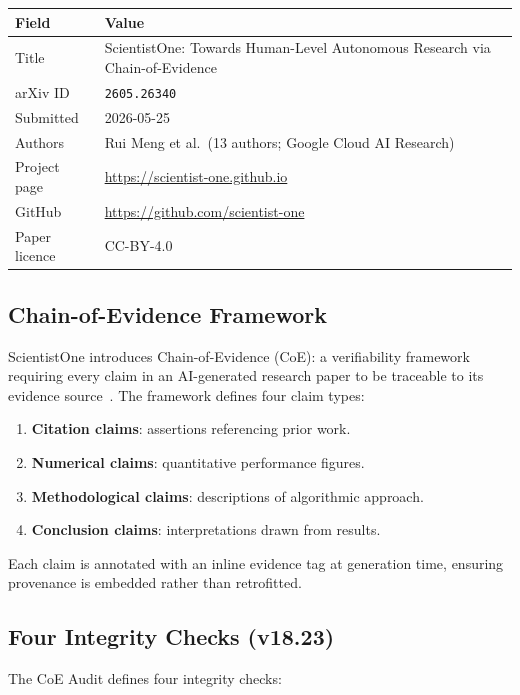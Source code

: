 \begin{center}
\begin{tabular}{ll}
\textbf{Field} & \textbf{Value} \\
\hline
Title & ScientistOne: Towards Human-Level Autonomous Research via Chain-of-Evidence \\
arXiv ID & \texttt{2605.26340} \\
Submitted & 2026-05-25 \\
Authors & Rui Meng et al.\ (13 authors; Google Cloud AI Research) \\
Project page & \url{https://scientist-one.github.io} \\
GitHub & \url{https://github.com/scientist-one} \\
Paper licence & CC-BY-4.0 \\
\end{tabular}
\end{center}

\subsection{Chain-of-Evidence Framework}
\label{ssec:coe-framework}

ScientistOne introduces Chain-of-Evidence (CoE): a verifiability framework
requiring every claim in an AI-generated research paper to be traceable to
its evidence source~\cite{scientistone_deep}.  The framework defines four
claim types:

\begin{enumerate}
  \item \textbf{Citation claims}: assertions referencing prior work.
  \item \textbf{Numerical claims}: quantitative performance figures.
  \item \textbf{Methodological claims}: descriptions of algorithmic approach.
  \item \textbf{Conclusion claims}: interpretations drawn from results.
\end{enumerate}

Each claim is annotated with an inline evidence tag at generation time,
ensuring provenance is embedded rather than retrofitted.

\subsection{Four Integrity Checks (v18.23)}
\label{ssec:coe-checks}

The CoE Audit defines four integrity checks:

